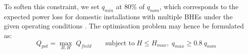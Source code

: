 To soften this constraint, we set $q_{min}$ at 80\% of $q_{nom}$, which corresponds to the expected power loss for domestic installations with multiple BHEs under the given operating conditions \cite{sia_sondes_2010}.
The optimisation problem may hence be formulated as: 
%
\begin{equation}
\label{eq:optimisation}
    Q_{pot} = \max_{B, H} \; Q_{field} \quad \quad \text{subject to} \; H \leq H_{max}, \; q_{max} \geq 0.8 \ q_{nom}
\end{equation}

